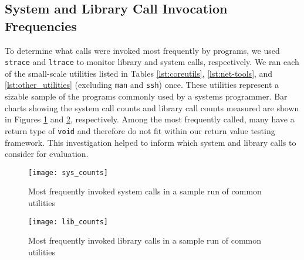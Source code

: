 \subsection{System and Library Call Invocation Frequencies}
To determine what calls were invoked most frequently by programs, we used \texttt{strace} and \texttt{ltrace} to monitor library and system calls, respectively. We ran each of the small-scale utilities listed in Tables \ref{lst:coreutils}, \ref{lst:net-tools}, and \ref{lst:other_utilities} (excluding \texttt{man} and \texttt{ssh}) once. These utilities represent a sizable sample of the programs commonly used by a systems programmer. Bar charts showing the system call counts and library call counts measured are shown in Figures \ref{fig:sys_counts} and \ref{fig:lib_counts}, respectively. Among the most frequently called, many have a return type of \texttt{void} and therefore do not fit within our return value testing framework. This investigation helped to inform which system and library calls to consider for evaluation.\\
\begin{figure}[h]
\centering
\texttt{[image: sys\_counts]}
\caption{Most frequently invoked system calls in a sample run of common utilities}
\label{fig:sys_counts}
\end{figure}

\begin{figure}[h]
\centering
\texttt{[image: lib\_counts]}
\caption{Most frequently invoked library calls in a sample run of common utilities}
\label{fig:lib_counts}
\end{figure}
